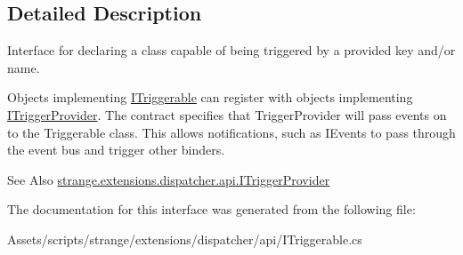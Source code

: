 \subsection{Detailed Description}
Interface for declaring a class capable of being triggered by a provided key and/or name. 

Objects implementing \hyperlink{interfacestrange_1_1extensions_1_1dispatcher_1_1api_1_1_i_triggerable}{I\-Triggerable} can register with objects implementing \hyperlink{interfacestrange_1_1extensions_1_1dispatcher_1_1api_1_1_i_trigger_provider}{I\-Trigger\-Provider}. The contract specifies that Trigger\-Provider will pass events on to the Triggerable class. This allows notifications, such as I\-Events to pass through the event bus and trigger other binders.

\begin{DoxySeeAlso}{See Also}
\hyperlink{interfacestrange_1_1extensions_1_1dispatcher_1_1api_1_1_i_trigger_provider}{strange.\-extensions.\-dispatcher.\-api.\-I\-Trigger\-Provider} 
\end{DoxySeeAlso}


The documentation for this interface was generated from the following file\-:\begin{DoxyCompactItemize}
\item 
Assets/scripts/strange/extensions/dispatcher/api/I\-Triggerable.\-cs\end{DoxyCompactItemize}
